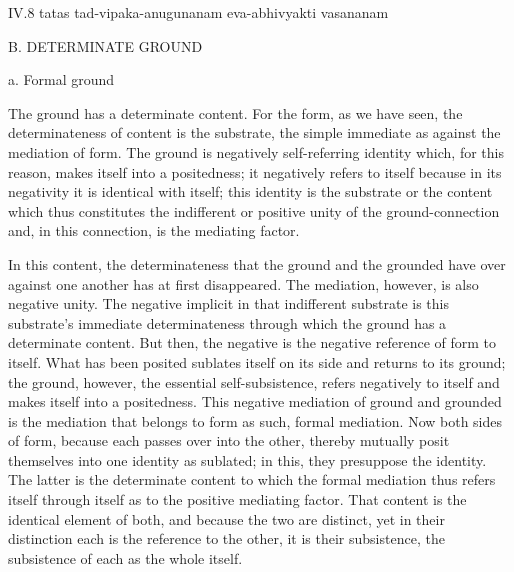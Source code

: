 IV.8
tatas tad-vipaka-anugunanam eva-abhivyakti vasananam

B. DETERMINATE GROUND

a. Formal ground

The ground has a determinate content.
For the form, as we have seen,
the determinateness of content is the substrate,
the simple immediate as against the mediation of form.
The ground is negatively self-referring identity which,
for this reason, makes itself into a positedness;
it negatively refers to itself because in its negativity
it is identical with itself;
this identity is the substrate or the content
which thus constitutes the indifferent
or positive unity of the ground-connection
and, in this connection, is the mediating factor.

In this content, the determinateness that
the ground and the grounded have over
against one another has at first disappeared.
The mediation, however, is also negative unity.
The negative implicit in that indifferent substrate is
this substrate's immediate determinateness through which
the ground has a determinate content.
But then, the negative is the negative reference of form to itself.
What has been posited sublates itself on its side
and returns to its ground;
the ground, however, the essential self-subsistence,
refers negatively to itself and makes itself into a positedness.
This negative mediation of ground and grounded is
the mediation that belongs to form as such, formal mediation.
Now both sides of form, because each passes over into the other,
thereby mutually posit themselves into one identity as sublated;
in this, they presuppose the identity.
The latter is the determinate content
to which the formal mediation thus refers itself
through itself as to the positive mediating factor.
That content is the identical element of both,
and because the two are distinct,
yet in their distinction each is
the reference to the other,
it is their subsistence,
the subsistence of each as the whole itself.

